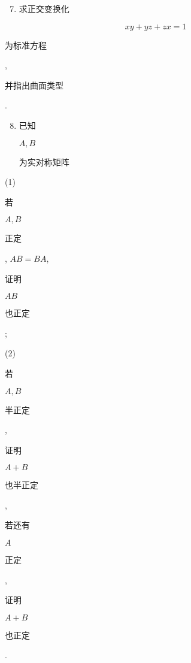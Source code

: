 \documentclass[10pt]{article}
\begin{document}
\begin{enumerate}
  \setcounter{enumi}{6}
  \item \begin{CJK}{UTF8}{mj}求正交变换化\end{CJK}
\end{enumerate}
$$
x y+y z+z x=1
$$
\begin{CJK}{UTF8}{mj}为标准方程\end{CJK}, \begin{CJK}{UTF8}{mj}并指出曲面类型\end{CJK}.

\begin{enumerate}
  \setcounter{enumi}{7}
  \item \begin{CJK}{UTF8}{mj}已知\end{CJK} $A, B$ \begin{CJK}{UTF8}{mj}为实对称矩阵\end{CJK}
\end{enumerate}
(1) \begin{CJK}{UTF8}{mj}若\end{CJK} $A, B$ \begin{CJK}{UTF8}{mj}正定\end{CJK}, $A B=B A$, \begin{CJK}{UTF8}{mj}证明\end{CJK} $A B$ \begin{CJK}{UTF8}{mj}也正定\end{CJK};

(2) \begin{CJK}{UTF8}{mj}若\end{CJK} $A, B$ \begin{CJK}{UTF8}{mj}半正定\end{CJK}, \begin{CJK}{UTF8}{mj}证明\end{CJK} $A+B$ \begin{CJK}{UTF8}{mj}也半正定\end{CJK}, \begin{CJK}{UTF8}{mj}若还有\end{CJK} $A$ \begin{CJK}{UTF8}{mj}正定\end{CJK}, \begin{CJK}{UTF8}{mj}证明\end{CJK} $A+B$ \begin{CJK}{UTF8}{mj}也正定\end{CJK}.
\end{document}
